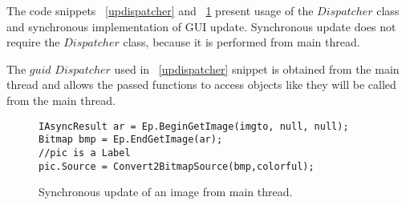 	The code snippets ~\ref{updispatcher} and ~\ref{upsynchronous} present usage of the $Dispatcher$ class and 
	synchronous implementation of GUI update. Synchronous update does not require the $Dispatcher$ class,
	because it is performed from main thread.

	The $guid$ $Dispatcher$ used in ~\ref{updispatcher} snippet is obtained from the main thread and
	allows the passed functions to access objects like they will be called from the main thread.

\begin{figure}[!hbp]
\begin{lstlisting}
IAsyncResult ar = Ep.BeginGetImage(imgto, null, null);
Bitmap bmp = Ep.EndGetImage(ar);
//pic is a Label
pic.Source = Convert2BitmapSource(bmp,colorful);
\end{lstlisting}
\caption{Synchronous update of an image from main thread.}
\label{upsynchronous}
\end{figure}

